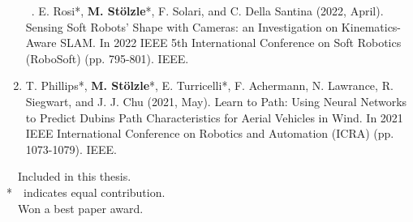 \begin{enumerate}
    \item[\faFileTextO \, \stepcounter{enumi}\arabic{enumi}.] \citep{rosi2022sensing} E. Rosi*, \textbf{M. Stölzle}*, F. Solari, and C. Della Santina (2022, April). Sensing Soft Robots' Shape with Cameras: an Investigation on Kinematics-Aware SLAM. In 2022 IEEE 5th International Conference on Soft Robotics (RoboSoft) (pp. 795-801). IEEE.
    \item \citep{phillips2021learn} T. Phillips*, \textbf{M. Stölzle}*, E. Turricelli*, F. Achermann, N. Lawrance, R. Siegwart, and J. J. Chu (2021, May). Learn to Path: Using Neural Networks to Predict Dubins Path Characteristics for Aerial Vehicles in Wind. In 2021 IEEE International Conference on Robotics and Automation (ICRA) (pp. 1073-1079). IEEE.
\end{enumerate}

\vspace{0.5cm}
\noindent
\faFileTextO~~Included in this thesis.\\
*~~indicates equal contribution.\\
\faTrophy~~Won a best paper award.

